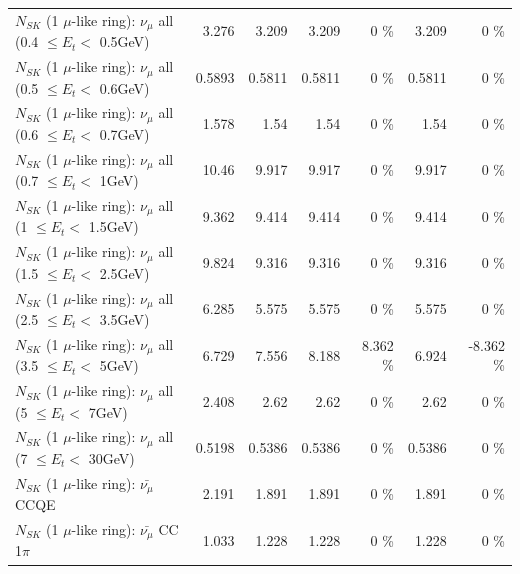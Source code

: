 \begin{table}
\begin{tabular}{| l | r | r | r  r | r  r |}
       $N_{SK}$ (1 $\mu$-like ring): $\nu_{\mu}$ all (0.4 $\leq E_{t} <$ 0.5GeV) &           3.276 &           3.209 &           3.209 &        0 \%  &           3.209 &        0 \%  \\ 
       $N_{SK}$ (1 $\mu$-like ring): $\nu_{\mu}$ all (0.5 $\leq E_{t} <$ 0.6GeV) &          0.5893 &          0.5811 &          0.5811 &        0 \%  &          0.5811 &        0 \%  \\ 
       $N_{SK}$ (1 $\mu$-like ring): $\nu_{\mu}$ all (0.6 $\leq E_{t} <$ 0.7GeV) &           1.578 &            1.54 &            1.54 &        0 \%  &            1.54 &        0 \%  \\ 
         $N_{SK}$ (1 $\mu$-like ring): $\nu_{\mu}$ all (0.7 $\leq E_{t} <$ 1GeV) &           10.46 &           9.917 &           9.917 &        0 \%  &           9.917 &        0 \%  \\ 
         $N_{SK}$ (1 $\mu$-like ring): $\nu_{\mu}$ all (1 $\leq E_{t} <$ 1.5GeV) &           9.362 &           9.414 &           9.414 &        0 \%  &           9.414 &        0 \%  \\ 
       $N_{SK}$ (1 $\mu$-like ring): $\nu_{\mu}$ all (1.5 $\leq E_{t} <$ 2.5GeV) &           9.824 &           9.316 &           9.316 &        0 \%  &           9.316 &        0 \%  \\ 
       $N_{SK}$ (1 $\mu$-like ring): $\nu_{\mu}$ all (2.5 $\leq E_{t} <$ 3.5GeV) &           6.285 &           5.575 &           5.575 &        0 \%  &           5.575 &        0 \%  \\ 
         $N_{SK}$ (1 $\mu$-like ring): $\nu_{\mu}$ all (3.5 $\leq E_{t} <$ 5GeV) &           6.729 &           7.556 &           8.188 &    8.362 \%  &           6.924 &   -8.362 \%  \\ 
           $N_{SK}$ (1 $\mu$-like ring): $\nu_{\mu}$ all (5 $\leq E_{t} <$ 7GeV) &           2.408 &            2.62 &            2.62 &        0 \%  &            2.62 &        0 \%  \\ 
          $N_{SK}$ (1 $\mu$-like ring): $\nu_{\mu}$ all (7 $\leq E_{t} <$ 30GeV) &          0.5198 &          0.5386 &          0.5386 &        0 \%  &          0.5386 &        0 \%  \\ 
\hline
\hline
\hline
                              $N_{SK}$ (1 $\mu$-like ring): $\bar{\nu_\mu}$ CCQE &           2.191 &           1.891 &           1.891 &        0 \%  &           1.891 &        0 \%  \\ 
                         $N_{SK}$ (1 $\mu$-like ring): $\bar{\nu_\mu}$ CC 1$\pi$ &           1.033 &           1.228 &           1.228 &        0 \%  &           1.228 &        0 \%  \\ 

\end{tabular}
\end{table}
